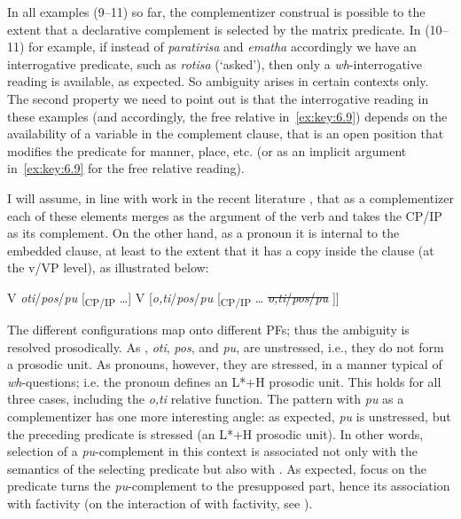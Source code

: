 \documentclass[output=paper]{langsci/langscibook}
\begin{document}
In all examples (9–11) so far, the complementizer construal is possible to the
extent that a declarative complement is selected by the matrix predicate. In
(10–11) for example, if instead of \emph{paratirisa} and \emph{ematha}
accordingly we have an interrogative predicate, such as \emph{rotisa}
(‘asked’), then only a \emph{wh}-interrogative reading is available, as expected. So
ambiguity arises in certain contexts only. The second property we need to point
out is that the interrogative reading in these examples (and accordingly, the
free relative in~\eqref{ex:key:6.9}) depends on the availability of a variable in the
complement clause, that is an open position that modifies the predicate for
manner, place, etc. (or as an implicit argument in~\eqref{ex:key:6.9} for the free relative
reading).

I will assume, in line with work in the recent literature
\parencite{ManSav2007,ManSav2011,Roussou2010,Franco2012}, that as a
complementizer each of these elements merges as the argument of the verb and
takes the CP/IP as its complement. On the other hand, as a pronoun it is
internal to the embedded clause, at least to the extent that it has a copy
inside the clause (at the v/VP level), as illustrated below:\largerpage

\ea\label{ex:key:6.12}
    \ea V \emph{oti}/\emph{pos}/\emph{pu} [\textsubscript{CP/}\textsubscript{IP} \dots{}]
    \ex V [\emph{o,ti}/\emph{pos}/\emph{pu} [\textsubscript{CP/}\textsubscript{IP} \dots{} \sout{\emph{o,ti}/\emph{pos}/\emph{pu}} ]]
	\z
\z

The different configurations map onto different \glspl{PF}; thus the ambiguity is
resolved prosodically. As , \emph{oti}, \emph{pos}, and
\emph{pu}, are unstressed, i.e., they do not form a prosodic unit. As pronouns,
however, they are stressed, in a manner typical of \emph{wh}-questions; i.e. the
pronoun defines an L*+H prosodic unit. This holds for all three cases,
including the \emph{o,ti} relative function. The pattern with \emph{pu} as a
complementizer has one more interesting angle: as expected, \emph{pu} is
unstressed, but the preceding predicate is stressed (an L*+H prosodic unit). In
other words, selection of a \emph{pu}{}-complement in this context is
associated not only with the semantics of the selecting predicate but also with
. As expected, focus on the predicate turns the \emph{pu}{}-complement to
the presupposed part, hence its association with factivity (on the interaction
of  with factivity, see \citealt{Kallulli2006}).
\end{document}

